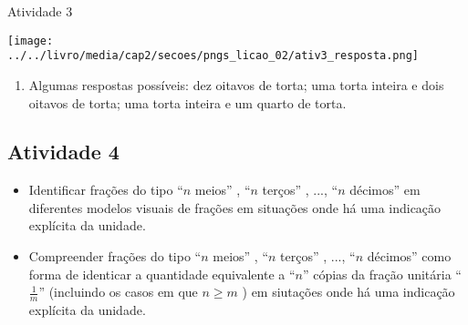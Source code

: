 \documentclass[oneside]{book}
\begin{document}
\begin{multicols}{2}
\begin{resposta*}{Atividade 3}
  \begin{center}
  \texttt{[image: ../../livro/media/cap2/secoes/pngs\_licao\_02/ativ3\_resposta.png]}
  \end{center}
  
\begin{enumerate} [\quad a)] %
    \item       Algumas respostas possíveis: dez oitavos de torta;  uma torta inteira e dois oitavos de torta; uma torta inteira e um quarto de torta.
\end{enumerate} %

\end{resposta*}



\subsection{Atividade 4}

   \vspace{.1cm}
  
\begin{itemize} %
    \item       Identificar frações do tipo       ``$n$ meios''      ,       ``$n$ terços''      , ...,       ``$n$ décimos''       em diferentes modelos visuais de frações em situações onde há uma indicação explícita da unidade.
    \item       Compreender frações do tipo       ``$n$ meios''      ,       ``$n$ terços''      , ...,       ``$n$ décimos''       como forma de identicar a quantidade equivalente a       ``$n$''       cópias da fração unitária       ``$\frac{1}{m}$''       (incluindo os casos em que       $n \geq m$      ) em siutações onde há uma indicação explícita da unidade.
\end{itemize} %


  \vspace{.1cm}
  
  \vspace{.1cm}


\end{multicols}
\end{document}
